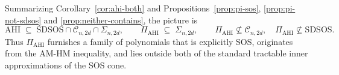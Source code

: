 \documentclass[12pt]{elsarticle}
\theoremstyle{definition}
\newcommand{\AHI}{\mathrm{AHI}}
\newcommand{\PiAHI}{\Pi_{\AHI}}
\newcommand{\SONC}{\mathcal{C}}
\newcommand{\SDSOS}{\mathrm{SDSOS}}
\begin{document}
Summarizing Corollary~\ref{cor:ahi-both} and Propositions~\ref{prop:pi-sos}, \ref{prop:pi-not-sdsos} and \ref{prop:neither-contains}, the picture is
\[
\AHI \;\subseteq\; \SDSOS\cap\SONC_{n,2d}\cap\Sigma_{n,2d},
\qquad
\PiAHI \;\subseteq\; \Sigma_{n,2d},
\qquad
\PiAHI \not\subseteq \SONC_{n,2d},\quad
\PiAHI \not\subseteq \SDSOS .
\]
Thus $\PiAHI$ furnishes a family of polynomials that is explicitly SOS, originates from the AM-HM inequality, and lies outside both of the standard tractable inner approximations of the SOS cone.

\pagebreak
%
%

 
\end{document}
